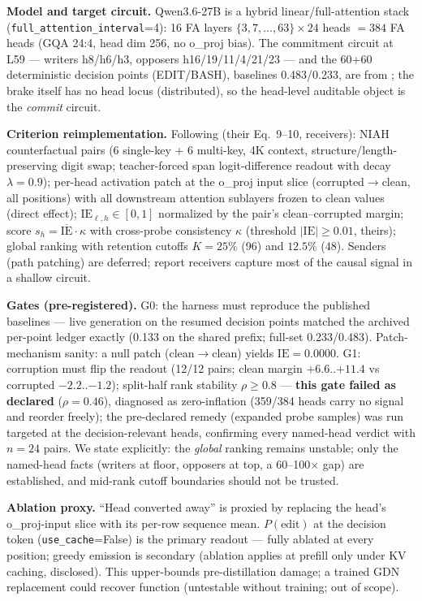 \documentclass[11pt]{article}
\begin{document}
\textbf{Model and target circuit.} Qwen3.6-27B is a hybrid linear/full-attention stack
(\texttt{full\_attention\_interval}=4): 16 FA layers $\{3,7,\dots,63\}\times 24$ heads $=384$ FA heads
(GQA 24:4, head dim 256, no o\_proj bias). The commitment circuit at L59 --- writers h8/h6/h3, opposers
h16/19/11/4/21/23 --- and the 60+60 deterministic decision points (EDIT/BASH), baselines
0.483/0.233, are from \citet{vicentino2026brake}; the brake itself has no head locus (distributed), so the
head-level auditable object is the \emph{commit} circuit.

\textbf{Criterion reimplementation.} Following \citet{tan2026hydrahead} (their Eq.~9--10, receivers): NIAH
counterfactual pairs (6 single-key + 6 multi-key, 4K context, structure/length-preserving digit swap;
teacher-forced span logit-difference readout with decay $\lambda{=}0.9$); per-head activation patch at the
o\_proj input slice (corrupted$\to$clean, all positions) with all downstream attention sublayers frozen to
clean values (direct effect); $\mathrm{IE}_{\ell,h}\in[0,1]$ normalized by the pair's clean--corrupted
margin; score $s_h = \overline{\mathrm{IE}}\cdot\kappa$ with cross-probe consistency
$\kappa$ (threshold $|\mathrm{IE}|\geq 0.01$, theirs); global ranking with retention cutoffs $K{=}25\%$
(96) and $12.5\%$ (48). Senders (path patching) are deferred; \citet{tan2026hydrahead} report receivers
capture most of the causal signal in a shallow circuit.

\textbf{Gates (pre-registered).} G0: the harness must reproduce the published baselines --- live
generation on the resumed decision points matched the archived per-point ledger exactly (0.133 on the
shared prefix; full-set 0.233/0.483). Patch-mechanism sanity: a null patch (clean$\to$clean) yields
$\mathrm{IE}=0.0000$. G1: corruption must flip the readout (12/12 pairs; clean margin $+6.6$..$+11.4$ vs
corrupted $-2.2$..$-1.2$); split-half rank stability $\rho\geq 0.8$ --- \textbf{this gate failed as
declared} ($\rho{=}0.46$), diagnosed as zero-inflation (359/384 heads carry no signal and reorder freely);
the pre-declared remedy (expanded probe samples) was run targeted at the decision-relevant heads,
confirming every named-head verdict with $n{=}24$ pairs. We state explicitly: the \emph{global} ranking
remains unstable; only the named-head facts (writers at floor, opposers at top, a 60--100$\times$ gap) are
established, and mid-rank cutoff boundaries should not be trusted.

\textbf{Ablation proxy.} ``Head converted away'' is proxied by replacing the head's o\_proj-input slice
with its per-row sequence mean. $P(\text{edit})$ at the decision token (\texttt{use\_cache}=False) is the
primary readout --- fully ablated at every position; greedy emission is secondary (ablation applies at
prefill only under KV caching, disclosed). This upper-bounds pre-distillation damage; a trained GDN
replacement could recover function (untestable without training; out of scope).
\end{document}
